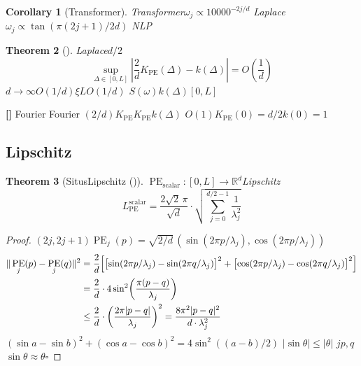 \documentclass[11pt,a4paper]{article}
\newtheorem{theorem}{Theorem}[section]
\newtheorem{corollary}[theorem]{Corollary}
\theoremstyle{remark}
\DeclareMathOperator{\PE}{PE}
\newcommand{\R}{\mathbb{R}}
\newcommand{\rigorous}{\textnormal{\textbf{[]}}}
\begin{document}
\begin{corollary}[Transformer]
\label{cor:1.2.2}
Transformer$\omega_j \propto 10000^{-2j/d}$
\textbf{}Laplace
$\omega_j \propto \tan(\pi(2j+1)/2d)$\textbf{}
NLP
\end{corollary}

\begin{theorem}[]
\label{thm:1.2.2}
Laplace$d/2$
\begin{equation}
    \boxed{
    \sup_{\Delta \in [0, L]} \left|\frac{2}{d}K_{\PE}(\Delta) - k(\Delta)\right|
    = O\!\left(\frac{1}{d}\right)
    }
\end{equation}
$d \to \infty$$O(1/d)$$\xi$$L$$O(1/d)$
$S(\omega)$$k(\Delta)$$[0,L]$
\end{theorem}

\rigorous{} \textbf{}
Fourier
Fourier
$(2/d)K_{\PE}$$K_{\PE}$$k(\Delta)$
$O(1)$$K_{\PE}(0)=d/2$$k(0)=1$

\subsection{Lipschitz}

\begin{theorem}[SitusLipschitz ()]
\label{thm:1.2.3}
$\PE_{\text{scalar}}: [0, L] \to \R^d$Lipschitz
\begin{equation}
    \boxed{
    L_{\PE}^{\text{scalar}} = \frac{2\sqrt{2}\,\pi}{\sqrt{d}} \cdot \sqrt{\sum_{j=0}^{d/2-1}\frac{1}{\lambda_j^2}}
    }
\end{equation}
\end{theorem}

\begin{proof}
$(2j, 2j+1)$$\PE_j(p) = \sqrt{2/d}\,(\sin(2\pi p/\lambda_j), \cos(2\pi p/\lambda_j))$
\begin{align}
    \|\PE_j(p) - \PE_j(q)\|^2
    &= \frac{2}{d}\Bigl[\bigl[\sin(2\pi p/\lambda_j) - \sin(2\pi q/\lambda_j)\bigr]^2
     + \bigl[\cos(2\pi p/\lambda_j) - \cos(2\pi q/\lambda_j)\bigr]^2\Bigr] \nonumber\\
    &= \frac{2}{d} \cdot 4\sin^2\!\left(\frac{\pi(p-q)}{\lambda_j}\right) \nonumber\\
    &\leq \frac{2}{d} \cdot \left(\frac{2\pi|p-q|}{\lambda_j}\right)^2
     = \frac{8\pi^2|p-q|^2}{d \cdot \lambda_j^2}
\end{align}
$(\sin a - \sin b)^2 + (\cos a - \cos b)^2 = 4\sin^2((a-b)/2)$
$|\sin\theta| \leq |\theta|$
$j$$p, q$$\sin\theta \approx \theta$\hfill $\square$
\end{proof}
\end{document}
